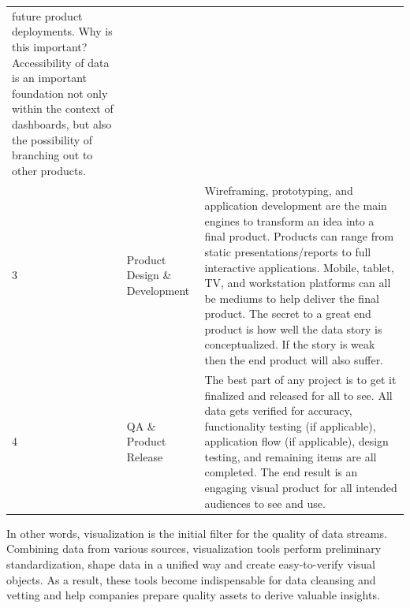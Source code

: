 \documentclass[]{book}
\theoremstyle{definition}
\theoremstyle{definition}
\theoremstyle{definition}
\theoremstyle{remark}
\begin{document}
\begin{longtable}[]{@{}lll@{}}
\begin{minipage}[t]{0.76\columnwidth}
future product deployments. Why is this important? Accessibility of data
is an important foundation not only within the context of dashboards,
but also the possibility of branching out to other products.\strut
\end{minipage}\tabularnewline
\begin{minipage}[t]{0.04\columnwidth}\raggedright\strut
3\strut
\end{minipage} & \begin{minipage}[t]{0.11\columnwidth}\raggedright\strut
Product Design \& Development\strut
\end{minipage} & \begin{minipage}[t]{0.76\columnwidth}\raggedright\strut
Wireframing, prototyping, and application development are the main
engines to transform an idea into a final product. Products can range
from static presentations/reports to full interactive applications.
Mobile, tablet, TV, and workstation platforms can all be mediums to help
deliver the final product. The secret to a great end product is how well
the data story is conceptualized. If the story is weak then the end
product will also suffer.\strut
\end{minipage}\tabularnewline
\begin{minipage}[t]{0.04\columnwidth}\raggedright\strut
4\strut
\end{minipage} & \begin{minipage}[t]{0.11\columnwidth}\raggedright\strut
QA \& Product Release\strut
\end{minipage} & \begin{minipage}[t]{0.76\columnwidth}\raggedright\strut
The best part of any project is to get it finalized and released for all
to see. All data gets verified for accuracy, functionality testing (if
applicable), application flow (if applicable), design testing, and
remaining items are all completed. The end result is an engaging visual
product for all intended audiences to see and use.\strut
\end{minipage}\tabularnewline
\bottomrule
\end{longtable}

In other words, visualization is the initial filter for the quality of
data streams. Combining data from various sources, visualization tools
perform preliminary standardization, shape data in a unified way and
create easy-to-verify visual objects. As a result, these tools become
indispensable for data cleansing and vetting and help companies prepare
quality assets to derive valuable insights.
\end{document}
